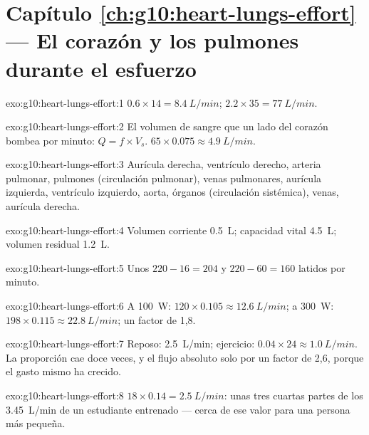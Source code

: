 \section*{Capítulo \ref{ch:g10:heart-lungs-effort} --- El corazón y los pulmones durante el esfuerzo}

\begin{solution}{exo:g10:heart-lungs-effort:1}
$0.6 \times 14 = \qty{8.4}{L/min}$; $2.2 \times 35 = \qty{77}{L/min}$.
\end{solution}

\begin{solution}{exo:g10:heart-lungs-effort:2}
El volumen de sangre que un lado del corazón bombea por minuto:
$Q = f \times V_s$. $65 \times 0.075 \approx \qty{4.9}{L/min}$.
\end{solution}

\begin{solution}{exo:g10:heart-lungs-effort:3}
Aurícula derecha, ventrículo derecho, arteria pulmonar, pulmones
(circulación pulmonar), venas pulmonares, aurícula izquierda,
ventrículo izquierdo, aorta, órganos (circulación sistémica), venas,
aurícula derecha.
\end{solution}

\begin{solution}{exo:g10:heart-lungs-effort:4}
Volumen corriente \qty{0.5}{L}; capacidad vital \qty{4.5}{L}; volumen
residual \qty{1.2}{L}.
\end{solution}

\begin{solution}{exo:g10:heart-lungs-effort:5}
Unos $220 - 16 = 204$ y $220 - 60 = 160$ latidos por minuto.
\end{solution}

\begin{solution}{exo:g10:heart-lungs-effort:6}
A \qty{100}{W}: $120 \times 0.105 \approx \qty{12.6}{L/min}$; a
\qty{300}{W}: $198 \times 0.115 \approx \qty{22.8}{L/min}$; un factor
de 1,8.
\end{solution}

\begin{solution}{exo:g10:heart-lungs-effort:7}
Reposo: \qty{2.5}{L/min}; ejercicio: $0.04 \times 24 \approx
\qty{1.0}{L/min}$. La proporción cae doce veces, y el flujo absoluto
solo por un factor de 2,6, porque el gasto mismo ha crecido.
\end{solution}

\begin{solution}{exo:g10:heart-lungs-effort:8}
$18 \times 0.14 = \qty{2.5}{L/min}$: unas tres cuartas partes de los
\qty{3.45}{L/min} de un estudiante entrenado --- cerca de ese valor
para una persona más pequeña.
\end{solution}


